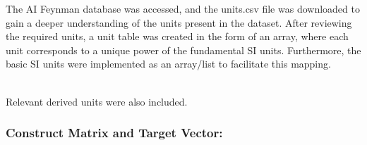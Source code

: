 \documentclass{article}
\begin{document}
The AI Feynman database was accessed, and the units.csv file was downloaded to gain a deeper understanding of the units present in the dataset. After reviewing the required units, a unit table was created in the form of an array, where each unit corresponds to a unique power of the fundamental SI units. Furthermore, the basic SI units were implemented as an array/list to facilitate this mapping.\\


\begin{table}[H]
\centering
{}
\caption{SI base and derived units with their corresponding vectorised representations.}
\label{tab:si_units_extended}
\end{table}\\





Relevant derived units were also included.\\

\subsubsection{Construct Matrix and Target Vector:}
\end{document}
